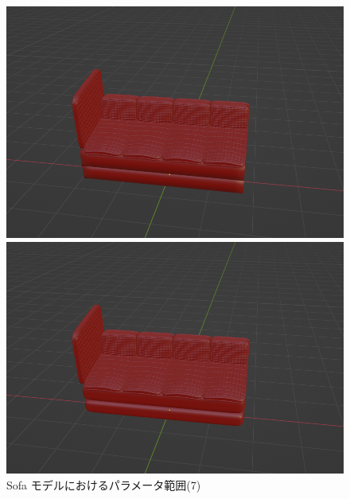 \begin{figure}[h]
 \begin{minipage}[b]{0.48\linewidth}
  \centering
  \includegraphics[scale=0.17]{./imgs/sofaParamMean/subdMin.png}
 \end{minipage}
 \begin{minipage}[b]{0.48\linewidth}
  \centering
  \includegraphics[scale=0.17]{./imgs/sofaParamMean/subdMax.png}
 \end{minipage}
 \caption{Sofa モデルにおけるパラメータ範囲(7)}\label{fig:sofaParamMean_7}
\end{figure}